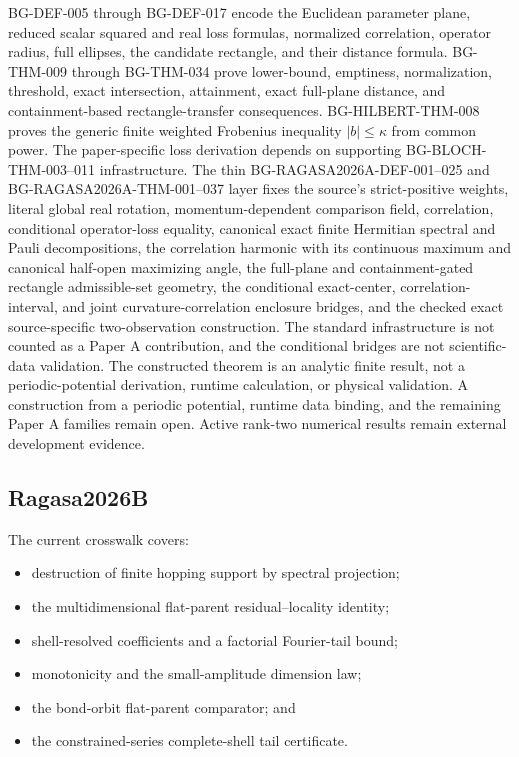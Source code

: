 \documentclass[11pt]{article}
\begin{document}
BG-DEF-005 through BG-DEF-017 encode the Euclidean parameter plane, reduced scalar
squared and real loss formulas, normalized correlation, operator radius, full ellipses,
the candidate rectangle, and their distance formula. BG-THM-009 through BG-THM-034
prove lower-bound, emptiness, normalization, threshold, exact intersection, attainment,
exact full-plane distance, and containment-based rectangle-transfer consequences.
BG-HILBERT-THM-008 proves the generic finite weighted Frobenius inequality
$|b|\le\kappa$ from common power. The paper-specific loss derivation depends on supporting BG-BLOCH-THM-003--011
infrastructure. The thin BG-RAGASA2026A-DEF-001--025 and
BG-RAGASA2026A-THM-001--037 layer fixes the source's strict-positive weights, literal
global real rotation, momentum-dependent comparison field, correlation, conditional
operator-loss equality, canonical exact finite Hermitian spectral and Pauli decompositions,
the correlation harmonic with its continuous maximum and canonical half-open maximizing
angle, the full-plane and containment-gated rectangle admissible-set geometry, the
conditional exact-center, correlation-interval, and joint curvature-correlation enclosure
bridges, and the checked exact
source-specific two-observation construction. The standard infrastructure is not counted
as a Paper A contribution, and the conditional bridges are not scientific-data validation.
The constructed theorem is an analytic finite result, not a periodic-potential derivation,
runtime calculation, or physical validation. A construction from a periodic potential,
runtime data binding, and the remaining Paper A families remain open. Active rank-two
numerical results remain external development evidence.

\subsection{Ragasa2026B}

The current crosswalk covers:
\begin{itemize}
 \item destruction of finite hopping support by spectral projection;
 \item the multidimensional flat-parent residual--locality identity;
 \item shell-resolved coefficients and a factorial Fourier-tail bound;
 \item monotonicity and the small-amplitude dimension law;
 \item the bond-orbit flat-parent comparator; and
 \item the constrained-series complete-shell tail certificate.
\end{itemize}
\end{document}
